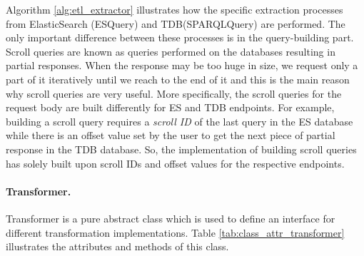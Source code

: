 % 
% 
% 
% 

Algorithm \ref{alg:etl_extractor} illustrates how the specific extraction processes from ElasticSearch 
(ESQuery) and TDB(SPARQLQuery) are performed. The only important difference between these processes is 
in the query-building part. Scroll queries are known as queries performed on the databases resulting 
in 
partial responses. When the response may be too huge in size, we request only a part of it iteratively 
until we reach to the end of it and this is the main reason why scroll queries are very useful. More 
specifically, the scroll queries for the request body are built differently for ES and TDB endpoints. For 
example, building a scroll query requires a \textit{scroll ID} of the last query in the ES database while there 
is an offset value set by the user to get the next piece of partial response in the TDB database. 
So, the implementation of building scroll queries has solely built upon scroll IDs and offset values 
for the respective endpoints.

\paragraph{Transformer.}
Transformer is a pure abstract class which is used to define an interface for different 
transformation implementations. Table \ref{tab:class_attr_transformer} illustrates the 
attributes and methods of this class.

